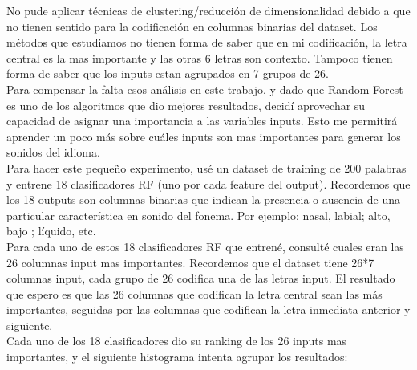 \documentclass[paper=a4, fontsize=11pt]{scrartcl} %
\numberwithin{equation}{section} %
\numberwithin{figure}{section} %
\numberwithin{table}{section} %
\begin{document}
No pude aplicar técnicas de clustering/reducción de dimensionalidad debido a que no tienen sentido para la codificación en columnas binarias del dataset. Los métodos que estudiamos no tienen forma de saber que en mi codificación, la letra central es la mas importante y las otras 6 letras son contexto. Tampoco tienen forma de saber que los inputs estan agrupados en 7 grupos de 26. \\

Para compensar la falta esos análisis en este trabajo, y dado que Random Forest es uno de los algoritmos que dio mejores resultados, decidí aprovechar su capacidad de asignar una importancia a las variables inputs. Esto me permitirá aprender un poco más sobre cuáles inputs son mas importantes para generar los sonidos del idioma. \\

Para hacer este pequeño experimento, usé un dataset de training de 200 palabras y entrene 18 clasificadores RF (uno por cada feature del output). Recordemos que los 18 outputs son columnas binarias que indican la presencia o ausencia de una particular característica en sonido del fonema. Por ejemplo: nasal, labial; alto, bajo ; líquido, etc. \\

Para cada uno de estos 18 clasificadores RF que entrené, consulté cuales eran las 26 columnas input mas importantes. Recordemos que el dataset tiene 26*7 columnas input, cada grupo de 26 codifica una de las letras input. El resultado que espero es que las 26 columnas que codifican la letra central sean las más importantes, seguidas por las columnas que codifican la letra inmediata anterior y siguiente. \\

Cada uno de los 18 clasificadores dio su ranking de los 26 inputs mas importantes, y el siguiente histograma intenta agrupar los resultados:
\end{document}
